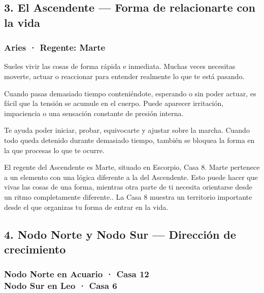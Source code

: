 \documentclass[11pt,a4paper]{article}
\begin{document}
\vspace{0.5cm}


\subsection{3. El Ascendente — Forma de relacionarte con la vida}

\subsubsection*{Aries · Regente: Marte}

Sueles vivir las cosas de forma rápida e inmediata. Muchas veces necesitas moverte, actuar o reaccionar para entender realmente lo que te está pasando.

Cuando pasas demasiado tiempo conteniéndote, esperando o sin poder actuar, es fácil que la tensión se acumule en el cuerpo. Puede aparecer irritación, impaciencia o una sensación constante de presión interna.

Te ayuda poder iniciar, probar, equivocarte y ajustar sobre la marcha. Cuando todo queda detenido durante demasiado tiempo, también se bloquea la forma en la que procesas lo que te ocurre.

El regente del Ascendente es Marte, situado en Escorpio, Casa 8. Marte pertenece a un elemento con una lógica diferente a la del Ascendente. Esto puede hacer que vivas las cosas de una forma, mientras otra parte de ti necesita orientarse desde un ritmo completamente diferente.. La Casa 8 muestra un territorio importante desde el que organizas tu forma de entrar en la vida.

\vspace{0.5cm}


\subsection{4. Nodo Norte y Nodo Sur — Dirección de crecimiento}

\subsubsection*{Nodo Norte en Acuario · Casa 12 \\
Nodo Sur en Leo · Casa 6}
\end{document}
